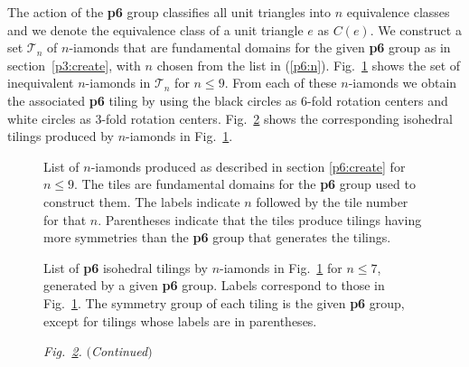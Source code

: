 \documentclass{ws-ijcga}
\begin{document}
The action of the {\bf p6} group classifies all unit triangles into $n$ equivalence classes and we denote
the equivalence class of a unit triangle $e$ as $C(e)$. 
We construct a set $\mathscr{T}_n$ of $n$-iamonds that are
fundamental domains for the given {\bf p6} group as in section~\ref{p3:create}, 
with $n$ chosen from the list in (\ref{p6:n}). 
Fig.~\ref{p6fighi} shows the set of inequivalent $n$-iamonds in $\mathscr{T}_n$
for $n \le 9$. 
From each of these $n$-iamonds we obtain the associated {\bf p6} tiling 
by using the black circles as 6-fold rotation centers
and white circles as 3-fold rotation centers. 
Fig.~\ref{p6tiling} shows the corresponding isohedral tilings 
produced by $n$-iamonds in Fig.~\ref{p6fighi}.
\begin{figure}\centerline{
}
\vspace*{8pt}
\caption{
List of $n$-iamonds produced as described in section \ref{p6:create} for $n \le 9$. 
The tiles are fundamental domains for the {\bf p6} group used to construct them. 
The labels indicate $n$ followed by the tile number for that $n$. 
Parentheses indicate that the tiles produce tilings having more symmetries than the {\bf p6} group that generates the tilings.
\label{p6fighi}
}
\end{figure}
\begin{figure}\centerline{
}
\vspace*{8pt}
\caption{
List of {\bf p6} isohedral tilings by $n$-iamonds in Fig.~\ref{p6fighi} for $n \le 7$, 
generated by a given {\bf p6} group. 
Labels correspond to those in Fig.~\ref{p6fighi}. 
The symmetry group of each tiling is the given {\bf p6} group, 
except for tilings whose labels are in parentheses.
\label{p6tiling}
}
\end{figure}
\begin{figure}\centerline{
}
\vspace*{8pt}
\fontsize{8pt}{0pt}\selectfont
    {\it Fig.~\ref{p6tiling}.} $(${\it Continued}$)$
\end{figure}
\end{document}

